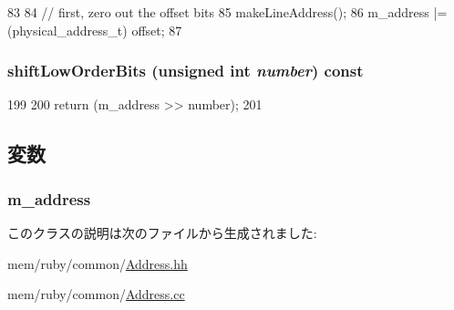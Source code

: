 \begin{DoxyCode}
83     {
84         // first, zero out the offset bits
85         makeLineAddress();
86         m_address |= (physical_address_t) offset;
87     }
\end{DoxyCode}
\hypertarget{classAddress_a146a23f7187a79982f77b143db52835f}{
\subsubsection[{shiftLowOrderBits}]{ shiftLowOrderBits (unsigned int {\em number}) const}}
\label{classAddress_a146a23f7187a79982f77b143db52835f}



\begin{DoxyCode}
199 {
200     return (m_address >> number);
201 }
\end{DoxyCode}


\subsection{変数}
\hypertarget{classAddress_a854e037cfd8d3493a1770258559bf1b0}{
\subsubsection[{m\_\-address}]{ {\bf m\_\-address}}}
\label{classAddress_a854e037cfd8d3493a1770258559bf1b0}


このクラスの説明は次のファイルから生成されました:\begin{DoxyCompactItemize}
\item 
mem/ruby/common/\hyperlink{Address_8hh}{Address.hh}\item 
mem/ruby/common/\hyperlink{Address_8cc}{Address.cc}\end{DoxyCompactItemize}
